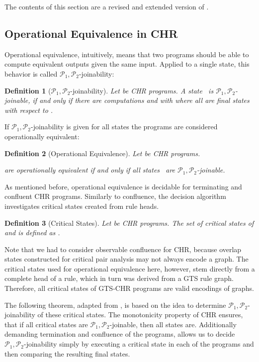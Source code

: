 \documentclass{tlp}
\newtheorem{definition}{Definition}[section]
\newcommand{\mcP}{\ensuremath{\mathcal{P}}}
\newcommand{\Ps}{\ensuremath{\mcP_1,\mcP_2}}
\begin{document}
The contents of this section are a revised and extended version of
\cite{Raiser2009b}.

\subsection{Operational Equivalence in CHR}
\label{sec:opeq_chr}

Operational equivalence, intuitively, means that two programs should be able to
compute equivalent outputs given the same input. Applied to a single state, this
behavior is called \Ps-joinability:

\begin{definition}[\Ps-joinability]\label{def:p_joinable} Let  be CHR
programs. A state~ is \emph{\Ps-joinable}, if and only if there are
computations  and  with  where all  are final states
with respect to .
\end{definition}

If \Ps-joinability is given for all states the programs are considered
operationally equivalent:

\begin{definition}[Operational Equivalence]
Let  be CHR programs.

 are \emph{operationally equivalent} if and only if all states~
are \Ps-joinable.
\end{definition}

As mentioned before, operational equivalence is decidable for terminating and
confluent CHR programs. Similarly to confluence, the decision algorithm
investigates critical states created from rule heads.

\begin{definition}[Critical States]\label{def:critical_states} 
Let  be CHR programs. The set of \emph{critical states of  and
} is defined as .
\end{definition}

Note that we had to consider observable confluence for CHR, because overlap
states constructed for critical pair analysis may not always encode a graph. The
critical states used for operational equivalence here, however, stem directly
from a complete head of a rule, which in turn was derived from a GTS rule graph.
Therefore, all critical states of GTS-CHR programs are valid encodings of
graphs.

The following theorem, adapted from \cite{abdennadherfruehwirth99}, is based on
the idea to determine \Ps-joinability of these critical states. The monotonicity
property of CHR ensures, that if all critical states are \Ps-joinable, then all
states are. Additionally demanding termination and confluence of the programs,
allows us to decide \Ps-joinability simply by executing a critical state in each
of the programs and then comparing the resulting final states.
\end{document}
